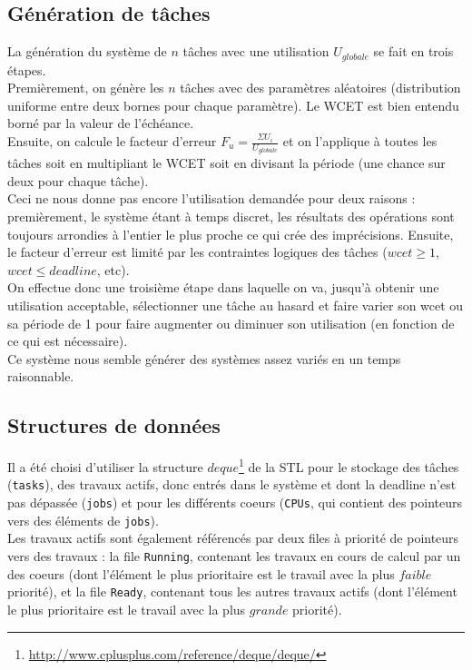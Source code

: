 \documentclass[a4paper,10pt]{article}
\begin{document}
\subsection{Génération de tâches}
La génération du système de $n$ tâches avec une utilisation $U_{globale}$ se fait en trois étapes.\\

Premièrement, on génère les $n$ tâches avec des paramètres aléatoires (distribution uniforme entre deux bornes pour chaque paramètre). Le WCET est bien entendu borné par la valeur de l'échéance.\\

Ensuite, on calcule le facteur d'erreur $F_u = \frac{\Sigma U_i}{U_{globale}}$ et on l'applique à toutes les tâches soit en multipliant le WCET soit en divisant la période (une chance sur deux pour chaque tâche).\\

Ceci ne nous donne pas encore l'utilisation demandée pour deux raisons : premièrement, le système étant à temps discret, les résultats des opérations sont toujours arrondies à l'entier le plus proche ce qui crée des imprécisions. Ensuite, le facteur d'erreur est limité par les contraintes logiques des tâches ($wcet \ge 1$, $wcet \le deadline$, etc).\\

On effectue donc une troisième étape dans laquelle on va, jusqu'à obtenir une utilisation acceptable, sélectionner une tâche au hasard et faire varier son wcet ou sa période de 1 pour faire augmenter ou diminuer son utilisation (en fonction de ce qui est nécessaire).\\

Ce système nous semble générer des systèmes assez variés en un temps raisonnable.

\subsection{Structures de données}
Il a été choisi d'utiliser la structure $deque$\footnote{\url{http://www.cplusplus.com/reference/deque/deque/}} de la STL pour le stockage des tâches (\verb?tasks?), des travaux actifs, donc entrés dans le système et dont la deadline n'est pas dépassée (\verb?jobs?) et pour les différents coeurs (\verb?CPUs?, qui contient des pointeurs vers des éléments de \verb?jobs?).\\

Les travaux actifs sont également référencés par deux files à priorité de pointeurs vers des travaux : la file \verb?Running?, contenant les travaux en cours de calcul par un des coeurs (dont l'élément le plus prioritaire est le travail avec la plus $faible$ priorité), et la file \verb?Ready?, contenant tous les autres travaux actifs (dont l'élément le plus prioritaire est le travail avec la plus $grande$ priorité).\\
\end{document}
